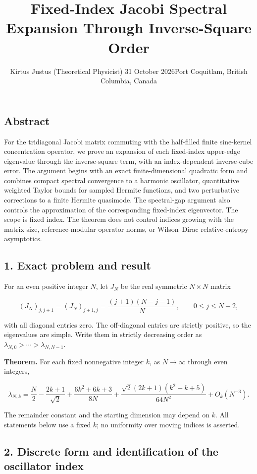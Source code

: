 \documentclass[
  10pt,
  a4paper,
]{article}
\title{Fixed-Index Jacobi Spectral Expansion Through Inverse-Square Order}
\author{Kirtus Justus (Theoretical Physicist) \textbullet{} 31 October 2026\tabularnewline Port Coquitlam, British Columbia, Canada}
\date{}
\begin{document}
\maketitle

\subsection{Abstract}\label{abstract}

For the tridiagonal Jacobi matrix commuting with the half-filled finite sine-kernel concentration operator, we prove an expansion of each fixed-index upper-edge eigenvalue through the inverse-square term, with an index-dependent inverse-cube error. The argument begins with an exact finite-dimensional quadratic form and combines compact spectral convergence to a harmonic oscillator, quantitative weighted Taylor bounds for sampled Hermite functions, and two perturbative corrections to a finite Hermite quasimode. The spectral-gap argument also controls the approximation of the corresponding fixed-index eigenvector. The scope is fixed index. The theorem does not control indices growing with the matrix size, reference-modular operator norms, or Wilson--Dirac relative-entropy asymptotics.

\subsection{1. Exact problem and result}\label{exact-problem-and-result}

For an even positive integer \(N\), let \(J_N\) be the real symmetric \(N\times N\) matrix

\[
(J_N)_{j,j+1}=(J_N)_{j+1,j}=\frac{(j+1)(N-j-1)}N,\qquad 0\le j\le N-2,
\]

with all diagonal entries zero. The off-diagonal entries are strictly positive, so the eigenvalues are simple. Write them in strictly decreasing order as \(\lambda_{N,0}>\cdots>\lambda_{N,N-1}\).

\textbf{Theorem.} For each fixed nonnegative integer \(k\), as \(N\to\infty\) through even integers,

\[
\boxed{\lambda_{N,k}=\frac N2-\frac{2k+1}{\sqrt2}
+\frac{6k^2+6k+3}{8N}
+\frac{\sqrt2(2k+1)(k^2+k+5)}{64N^2}
+O_k(N^{-3}).}\tag{1}
\]

The remainder constant and the starting dimension may depend on \(k\). All statements below use a fixed \(k\); no uniformity over moving indices is asserted.

\subsection{2. Discrete form and identification of the oscillator index}\label{discrete-form-and-identification-of-the-oscillator-index}
\end{document}
